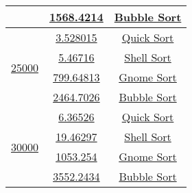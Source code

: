 \begin{lrbox}{\sorttime}
\begin{tabular}{|c|c|c|}
\cline{2-3}
 & {\href{T1.14.1}{1568.4214}} & {\href{T1.14.2}{Bubble Sort}}\\
\hline
 \multirow{4}{*}{\href{T1.16.0}{25000}} & {\href{T1.16.1}{3.528015}} & {\href{T1.16.2}{Quick Sort}}\\
\cline{2-3}
 & {\href{T1.17.1}{5.46716}} & {\href{T1.17.2}{Shell Sort}}\\
\cline{2-3}
 & {\href{T1.19.1}{799.64813}} & {\href{T1.19.2}{Gnome Sort}}\\
\cline{2-3}
 & {\href{T1.18.1}{2464.7026}} & {\href{T1.18.2}{Bubble Sort}}\\
\hline
 \multirow{4}{*}{\href{T1.20.0}{30000}} & {\href{T1.20.1}{6.36526}} & {\href{T1.20.2}{Quick Sort}}\\
\cline{2-3}
 & {\href{T1.21.1}{19.46297}} & {\href{T1.21.2}{Shell Sort}}\\
\cline{2-3}
 & {\href{T1.23.1}{1053.254}} & {\href{T1.23.2}{Gnome Sort}}\\
\cline{2-3}
 & {\href{T1.22.1}{3552.2434}} & {\href{T1.22.2}{Bubble Sort}}\\

\hline
\end{tabular}
\end{lrbox}

